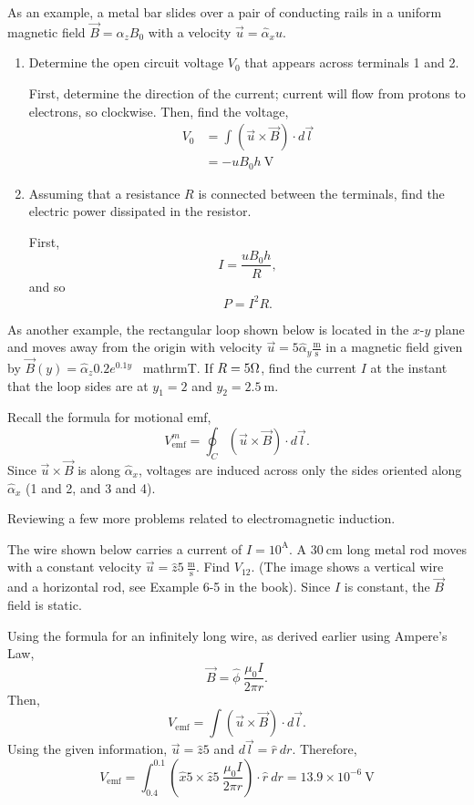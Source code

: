 \documentclass{article}
\begin{document}
As an example, a metal bar slides over a pair of conducting rails in a uniform magnetic field \(\vec{B} = \hat{\alpha}_z B_0\) with a velocity \(\vec{u} = \hat{\alpha}_x u\).
\begin{enumerate}[label=\alph*)]
	\item Determine the open circuit voltage \(V_0\) that appears across terminals 1 and 2.

		First, determine the direction of the current; current will flow from protons to electrons, so clockwise. Then, find the voltage,
		\begin{align*}
			V_0 &= \int_{}^{} (\vec{u} \times \vec{B}) \cdot d \vec{l} \\
					&=-u B_0 h \ \mathrm{V}
		\end{align*}
	\item Assuming that a resistance \(R\) is connected between the terminals, find the electric power dissipated in the resistor.

		First, 
		\[
		  I = \frac{u B_0 h}{R},
		\]
		and so
		\[
		  P = I^2 R.
		\]
\end{enumerate}
As another example, the rectangular loop shown below is located in the \(x\)-\(y\) plane and moves away from the origin with velocity \(\vec{u} = 5 \hat{\alpha}_y \mathrm{\frac{m}{s}}\) in a magnetic field given by \(\vec{B}(y) = \hat{\alpha}_z 0.2 e^{0.1y}\) \ mathrm{T}. If \(R = 5 \ohm\), find the current \(I\) at the instant that the loop sides are at \(y_1 = 2\) and \(y_2 = 2.5 \ \mathrm{m}\).

Recall the formula for motional emf, 
\[
	V_{\mathrm{emf}}^m = \oint_C (\vec{u} \times \vec{B}) \cdot d \vec{l}.
\]
Since \(\vec{u} \times \vec{B}\) is along \(\hat{\alpha}_x\), voltages are induced across only the sides oriented along \(\hat{\alpha}_x\) (1 and 2, and 3 and 4).

Reviewing a few more problems related to electromagnetic induction.

The wire shown below carries a current of \(I=10^{\mathrm{A}}\). A \(30 \ \mathrm{cm}\) long metal rod moves with a constant velocity \(\vec{u} = \hat{z}5 \ \mathrm{\frac{m}{s}}\). Find \(V_{12}\). (The image shows a vertical wire and a horizontal rod, see Example 6-5 in the book). Since \(I\) is constant, the \(\vec{B}\) field is static.

Using the formula for an infinitely long wire, as derived earlier using Ampere's Law, 
\[
  \vec{B} = \hat{\phi} \ \frac{\mu_0 I}{2\pi r}.
\]
Then, 
\[
	V_{\mathrm{emf}} = \int (\vec{u} \times \vec{B}) \cdot d \vec{l}.
\]
Using the given information, \(\vec{u} = \hat{z}5\) and \(d \vec{l} = \hat{r} \ dr\). 
Therefore, 
\[
	V_{\mathrm{emf}} = \int_{0.4}^{0.1}(\hat{x}5 \times \hat{z}5 \ \frac{\mu_0 I}{2\pi r}) \cdot \hat{r} \ dr = 13.9 \times 10^{-6} \ \mathrm{V}
\]
\end{document}
